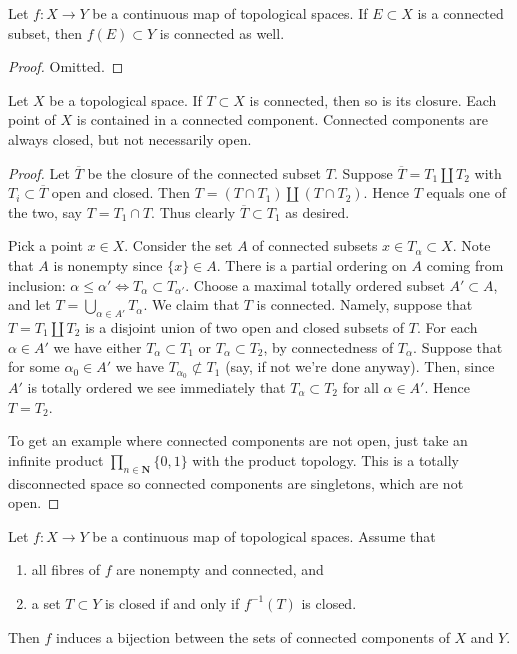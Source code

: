 \begin{lemma}
\label{lemma-image-connected-space}
Let $f : X \to Y$ be a continuous map of topological spaces.
If $E \subset X$ is a connected subset, then $f(E) \subset Y$
is connected as well.
\end{lemma}

\begin{proof}
Omitted.
\end{proof}

\begin{lemma}
\label{lemma-connected-components}
Let $X$ be a topological space. If $T \subset X$ is connected,
then so is its closure. Each point of $X$ is contained
in a connected component. Connected components are always closed,
but not necessarily open.
\end{lemma}

\begin{proof}
Let $\overline{T}$ be the closure of the connected subset $T$.
Suppose $\overline{T} = T_1 \coprod T_2$ with $T_i \subset \overline{T}$
open and closed. Then $T = (T\cap T_1) \coprod (T \cap T_2)$. Hence
$T$ equals one of the two, say $T = T_1 \cap T$. Thus clearly
$\overline{T} \subset T_1$ as desired.

\medskip\noindent
Pick a point $x\in X$. Consider the set $A$ of connected subsets
$x \in T_\alpha \subset X$. Note that $A$ is nonempty since
$\{x\} \in A$. There is a partial ordering on $A$ coming from
inclusion: $\alpha \leq \alpha' \Leftrightarrow T_\alpha \subset T_{\alpha'}$.
Choose a maximal totally ordered subset $A' \subset A$, and let
$T = \bigcup_{\alpha \in A'} T_\alpha$. We claim that $T$ is
connected. Namely, suppose that $T =  T_1 \coprod T_2$ is a disjoint
union of two open and closed subsets of $T$.
For each $\alpha \in A'$ we have either $T_\alpha \subset T_1$
or $T_\alpha \subset T_2$, by connectedness of $T_\alpha$.
Suppose that for some $\alpha_0 \in A'$ we have
$T_{\alpha_0} \not\subset T_1$ (say, if not we're done anyway).
Then, since $A'$ is totally ordered we see immediately that
$T_\alpha \subset T_2$ for all $\alpha \in A'$. Hence $T = T_2$.

\medskip\noindent
To get an example
where connected components are not open, just take
an infinite product $\prod_{n \in \mathbf{N}} \{0, 1\}$
with the product topology. This is a totally disconnected
space so connected components are singletons, which are
not open.
\end{proof}

\begin{lemma}
\label{lemma-connected-fibres-quotient-topology-connected-components}
Let $f : X \to Y$ be a continuous map of topological spaces.
Assume that
\begin{enumerate}
\item all fibres of $f$ are nonempty and connected, and
\item a set $T \subset Y$ is closed if and only if $f^{-1}(T)$ is closed.
\end{enumerate}
Then $f$ induces a bijection between the sets of connected
components of $X$ and $Y$.
\end{lemma}

